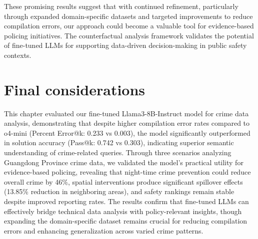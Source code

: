 These promising results suggest that with continued refinement, particularly through expanded domain-specific datasets and targeted improvements to reduce compilation errors, our approach could become a valuable tool for evidence-based policing initiatives. The counterfactual analysis framework validates the potential of fine-tuned LLMs for supporting data-driven decision-making in public safety contexts.


\section{Final considerations}

This chapter evaluated our fine-tuned Llama3-8B-Instruct model for crime data analysis, demonstrating that despite higher compilation error rates compared to o4-mini (Percent Error@k: 0.233 vs 0.003), the model significantly outperformed in solution accuracy (Pass@k: 0.742 vs 0.303), indicating superior semantic understanding of crime-related queries. Through three scenarios analyzing Guangdong Province crime data, we validated the model's practical utility for evidence-based policing, revealing that night-time crime prevention could reduce overall crime by 46\%, spatial interventions produce significant spillover effects (13.85\% reduction in neighboring areas), and safety rankings remain stable despite improved reporting rates. The results confirm that fine-tuned LLMs can effectively bridge technical data analysis with policy-relevant insights, though expanding the domain-specific dataset remains crucial for reducing compilation errors and enhancing generalization across varied crime patterns.